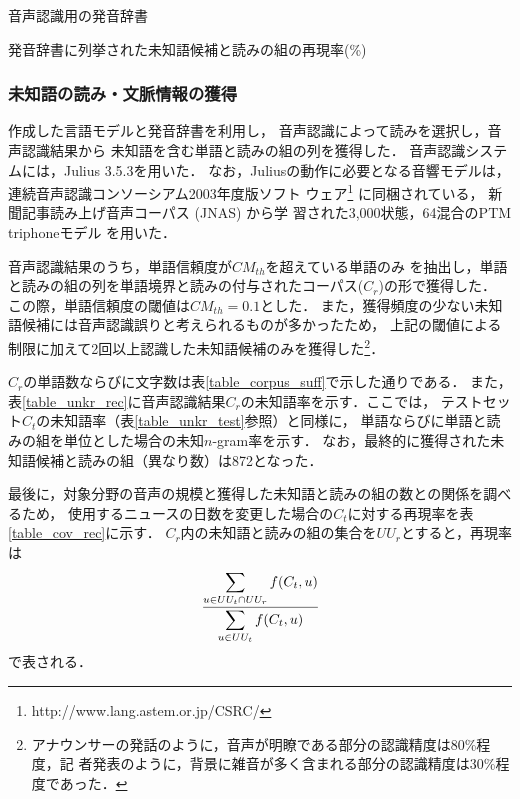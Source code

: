 \documentclass[japanese]{jnlp_1.4}
\begin{document}
\begin{table}[t]
  \caption{音声認識用の発音辞書}

 \label{table_pron-dict}
\end{table}
\begin{table}[t]
  \caption{発音辞書に列挙された未知語候補と読みの組の再現率(\%)}

  \label{table_cov_prondict}
\end{table}



\subsubsection{未知語の読み・文脈情報の獲得}

作成した言語モデルと発音辞書を利用し，
音声認識によって読みを選択し，音声認識結果から
未知語を含む単語と読みの組の列を獲得した．
音声認識システムには，Julius 3.5.3を用いた．
なお，Juliusの動作に必要となる音響モデルは，連続音声認識コンソーシアム2003年度版ソフト
ウェア\footnote{http://www.lang.astem.or.jp/CSRC/}
に同梱されている，
新聞記事読み上げ音声コーパス (JNAS) から学
習された3,000状態，64混合のPTM triphoneモデル
\cite{Phonetic.Tied-Mixture.モデルを用いた大語彙連続音声認識}
を用いた．


音声認識結果のうち，単語信頼度が$CM_{th}$を超えている単語のみ
を抽出し，単語と読みの組の列を単語境界と読みの付与されたコーパス($C_r$)の形で獲得した．
この際，単語信頼度の閾値は$CM_{th} = 0.1$とした．
また，獲得頻度の少ない未知語候補には音声認識誤りと考えられるものが多かったため，
上記の閾値による制限に加えて2回以上認識した未知語候補のみを獲得した\footnote{
アナウンサーの発話のように，音声が明瞭である部分の認識精度は80\%程度，記
者発表のように，背景に雑音が多く含まれる部分の認識精度は30\%程度であった．}．

$C_r$の単語数ならびに文字数は表\ref{table_corpus_suff}で示した通りである．
また，表\ref{table_unkr_rec}に音声認識結果$C_r$の未知語率を示す．ここでは，
テストセット$C_t$の未知語率（表\ref{table_unkr_test}参照）と同様に，
単語ならびに単語と読みの組を単位とした場合の未知$n$-gram率を示す．
なお，最終的に獲得された未知語候補と読みの組（異なり数）は872となった．


最後に，対象分野の音声の規模と獲得した未知語と読みの組の数との関係を調べるため，
使用するニュースの日数を変更した場合の$C_t$に対する再現率を表\ref{table_cov_rec}に示す．
$C_r$内の未知語と読みの組の集合を$UU_{r}$とすると，再現率は
\[
\cfrac{\displaystyle{\sum_{u \in UU_t \cap UU_{r}} f(C_t, u)}}
 {\displaystyle{\sum_{u \in UU_t } f(C_t, u)}}
\]
で表される．
\end{document}
